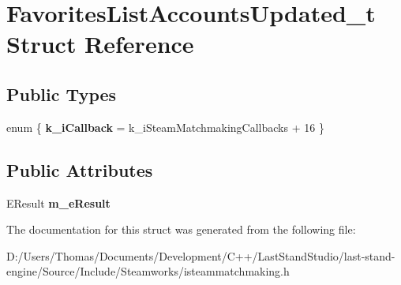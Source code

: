 \hypertarget{structFavoritesListAccountsUpdated__t}{}\section{Favorites\+List\+Accounts\+Updated\+\_\+t Struct Reference}
\label{structFavoritesListAccountsUpdated__t}
\subsection*{Public Types}
\begin{DoxyCompactItemize}
\item 
\hypertarget{structFavoritesListAccountsUpdated__t_a98e8a62eb3a1a5596269e9f20762aabb}{}enum \{ {\bfseries k\+\_\+i\+Callback} = k\+\_\+i\+Steam\+Matchmaking\+Callbacks + 16
 \}\label{structFavoritesListAccountsUpdated__t_a98e8a62eb3a1a5596269e9f20762aabb}

\end{DoxyCompactItemize}
\subsection*{Public Attributes}
\begin{DoxyCompactItemize}
\item 
\hypertarget{structFavoritesListAccountsUpdated__t_ad582f1262ddc5b1f20a054d1de4bba61}{}E\+Result {\bfseries m\+\_\+e\+Result}\label{structFavoritesListAccountsUpdated__t_ad582f1262ddc5b1f20a054d1de4bba61}

\end{DoxyCompactItemize}


The documentation for this struct was generated from the following file\+:\begin{DoxyCompactItemize}
\item 
D\+:/\+Users/\+Thomas/\+Documents/\+Development/\+C++/\+Last\+Stand\+Studio/last-\/stand-\/engine/\+Source/\+Include/\+Steamworks/isteammatchmaking.\+h\end{DoxyCompactItemize}
